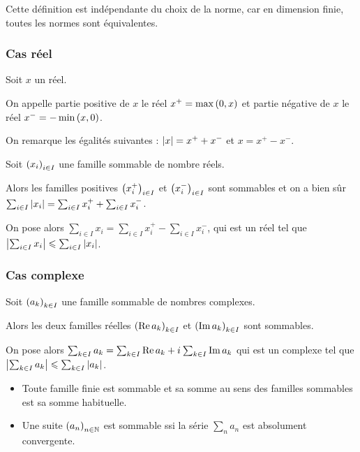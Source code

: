 Cette définition est indépendante du choix de la norme, car en dimension finie, toutes les normes sont équivalentes.

\subsubsection{Cas réel}

\begin{defi}
Soit \(x\) un réel.

On appelle partie positive de \(x\) le réel \(x^+=\max\left(0,x\right)\) et partie négative de \(x\) le réel \(x^-=-\min\left(x,0\right)\).
\end{defi}

On remarque les égalités suivantes : \(\left\lvert x\right\rvert=x^++x^-\) et \(x=x^+-x^-\).

\begin{prop}
Soit \(\left(x_i\right)_{i\in I}\) une famille sommable de nombre réels.

Alors les familles positives \(\left(x_i^+\right)_{i\in I}\) et \(\left(x_i^-\right)_{i\in I}\) sont sommables et on a bien sûr \(\sum_{i\in I}\left\lvert x_i\right\rvert=\sum_{i\in I}x_i^++\sum_{i\in I}x_i^-\).
\end{prop}

On pose alors \(\sum_{i\in I}x_i=\sum_{i\in I}x_i^+-\sum_{i\in I}x_i^-\), qui est un réel tel que \(\left\lvert\sum_{i\in I}x_i\right\rvert\leqslant\sum_{i\in I}\left\lvert x_i\right\rvert\).

\subsubsection{Cas complexe}

\begin{prop}
Soit \(\left(a_k\right)_{k\in I}\) une famille sommable de nombres complexes.

Alors les deux familles réelles \(\left(\operatorname{Re} a_k\right)_{k\in I}\) et \(\left(\operatorname{Im} a_k\right)_{k\in I}\) sont sommables.
\end{prop}

On pose alors \(\sum_{k\in I}a_k=\sum_{k\in I}\operatorname{Re} a_k+i\mkern1mu\sum_{k\in I}\operatorname{Im} a_k\) qui est un complexe tel que \(\left\lvert\sum_{k\in I}a_k\right\rvert\leqslant\sum_{k\in I}\left\lvert a_k\right\rvert\).

\begin{ex}
\begin{itemize}
    \item Toute famille finie est sommable et sa somme au sens des familles sommables est sa somme habituelle. \\
    \item Une suite \(\left(a_n\right)_{n\in\mathbb{N}}\) est sommable ssi la série \(\sum_na_n\) est absolument convergente.
\end{itemize}
\end{ex}

